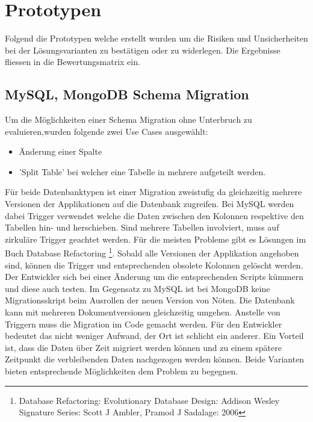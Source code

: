 \section{Prototypen}

Folgend die Prototypen welche erstellt wurden um die Risiken und Unsicherheiten bei der Lösungsvarianten zu bestätigen oder zu widerlegen. Die Ergebnisse fliessen in die Bewertungsmatrix ein.

\subsection{MySQL, MongoDB Schema Migration}

Um die Möglichkeiten einer Schema Migration ohne Unterbruch zu evaluieren,wurden folgende zwei Use Cases ausgewählt:
\newline
\begin{itemize}
	\item Änderung einer Spalte
	\item 'Split Table' bei welcher eine Tabelle in mehrere aufgeteilt werden.
\end{itemize}

Für beide Datenbanktypen ist einer Migration zweistufig da gleichzeitig mehrere Versionen der Applikationen auf die Datenbank zugreifen. Bei MySQL werden dabei Trigger verwendet welche die Daten zwischen den Kolonnen respektive den Tabellen hin- und herschieben. Sind mehrere Tabellen involviert, muss auf zirkuläre Trigger geachtet werden. Für die meisten Probleme gibt es Lösungen im Buch Database Refactoring \footnote{Database Refactoring: Evolutionary Database Design: Addison Wesley Signature Series: Scott J Ambler, Pramod J Sadalage: 2006}. Sobald alle Versionen der Applikation angehoben sind, können die Trigger und entsprechenden obsolete Kolonnen gelöscht werden. Der Entwickler sich bei einer Änderung um die entsprechenden Scripts kümmern und diese auch testen.\newline
Im Gegensatz zu MySQL ist bei MongoDB keine Migrationsskript beim Ausrollen der neuen Version von Nöten. Die Datenbank kann mit mehreren Dokumentversionen gleichzeitig umgehen. Anstelle von Triggern muss die Migration im Code gemacht werden. Für den Entwickler bedeutet das nicht weniger Aufwand, der Ort ist schlicht ein anderer. Ein Vorteil ist, dass die Daten über Zeit migriert werden können und zu einem spätere Zeitpunkt die verbleibenden Daten nachgezogen werden können.\newline
Beide Varianten bieten entsprechende Möglichkeiten dem Problem zu begegnen.

